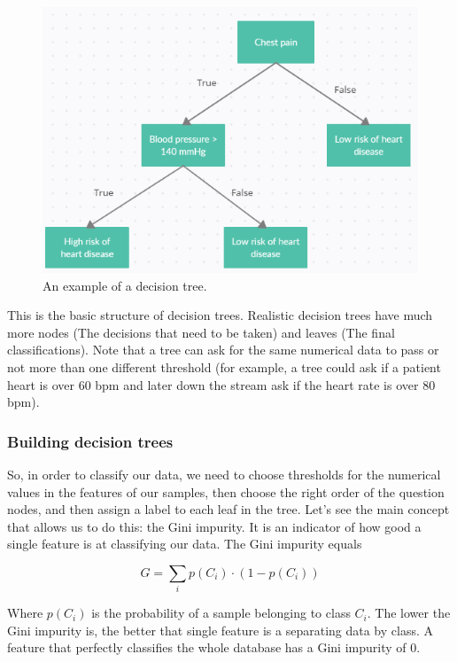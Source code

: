 \documentclass[a4paper]{report}
\begin{document}
\begin{figure} [H]
    \centering
    \includegraphics [width=12cm] {o/chestt.png}
    \caption{An example of a decision tree.}
    \label{chestt}
\end{figure}

This is the basic structure of decision trees.
Realistic decision trees have much more nodes (The decisions that need to be taken) and leaves (The final classifications).
Note that a tree can ask for the same numerical data to pass or not more than one different threshold (for example, a tree could ask if a patient heart is over 60 bpm and later down the stream ask if the heart rate is over 80 bpm).

\subsubsection{Building decision trees}

So, in order to classify our data, we need to choose thresholds for the numerical values in the features of our samples, then choose the right order of the question nodes, and then assign a label to each leaf in the tree.
Let's see the main concept that allows us to do this:
the Gini impurity.
It is an indicator of how good a single feature is at classifying our data.
The Gini impurity equals

\begin{equation}
    G = \sum_i p(C_i) \cdot (1 - p(C_i))
\end{equation}

Where $p(C_i)$ is the probability of a sample belonging to class $C_i$.
The lower the Gini impurity is, the better that single feature is a separating data by class.
A feature that perfectly classifies the whole database has a Gini impurity of 0.
\end{document}
